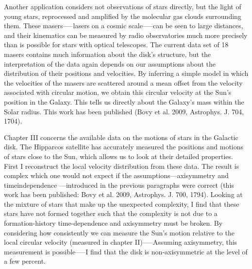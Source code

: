 Another application considers not observations of stars directly, but
the light of young stars, reprocessed and amplified by the molecular
gas clouds surrounding them. These masers—--lasers on a cosmic
scale—--can be seen to large distances, and their kinematics can be
measured by radio observatories much more precisely than is possible
for stars with optical telescopes. The current data set of 18 masers
contains much information about the disk’s structure, but the
interpretation of the data again depends on our assumptions about the
distribution of their positions and velocities. By inferring a simple
model in which the velocities of the masers are scattered around a
mean offset from the velocity associated with circular motion, we
obtain this circular velocity at the Sun’s position in the
Galaxy. This tells us directly about the Galaxy’s mass within the
Solar radius. This work has been published (Bovy et al. 2009,
Astrophys. J.  704, 1704). 

Chapter III concerns the available data on the motions of stars in the
Galactic disk. The Hipparcos satellite has accurately measured the
positions and motions of stars close to the Sun, which allows us to
look at their detailed properties. First I reconstruct the local
velocity distribution from these data. The result is complex which one
would not expect if the assumptions—axisymmetry and timeindependence
—introduced in the previous paragraphs were correct (this work has
been published: Bovy et al. 2009, Astrophys. J. 700, 1794). Looking at
the mixture of stars that make up the unexpected complexity, I find
that these stars have not formed together such that the complexity is
not due to a formation-history time-dependence and axisymmetry must be
broken. By considering how consistently we can measure the Sun’s
motion relative to the local circular velocity (measured in chapter
II)—--Assuming axisymmetry, this measurement is possible—--I find that
the disk is non-axisymmetric at the level of a few percent.
